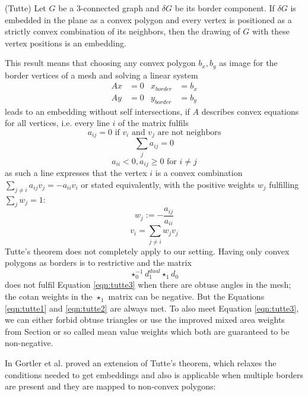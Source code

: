 \begin{thm}(Tutte)\cite{Gortler} Let $G$ be a $3$-connected graph and $\delta G$ be its border component. If $\delta G$ is embedded in the plane as a convex polygon and every vertex is positioned as a strictly convex combination of its neighbors, then the drawing of $G$ with these vertex positions is an embedding. 
\end{thm}

This result means that choosing any convex polygon $b_x, b_y$ as image for the border vertices of a mesh and solving a linear system
\begin{align*}Ax &= 0 & x_{border} &= b_x\\
Ay &= 0 &y_{border} &= b_y\end{align*}
leads to an embedding without self intersections, if $A$ describes convex equations for all vertices, i.e. every line $i$ of the matrix fulfils
\begin{equation}
a_{ij} = 0 \text{ if $v_i$ and $v_j$ are not neighbors} \label{eqn:tutte1}
\end{equation}
\begin{equation}\sum_{j} a_{ij} = 0\label{eqn:tutte2}
\end{equation}
\begin{equation}
a_{ii} <0, a_{ij} \geq 0 \text{ for $i\neq j$}\label{eqn:tutte3}
\end{equation}
as such a line expresses that the vertex $i$ is a convex combination $\sum_{j\neq i} a_{ij} v_j = -a_{ii}v_i$ or stated equivalently, with the positive weights $w_j$ fulfilling $\sum_{j} w_j = 1$:
\[w_j := -\frac{a_{ij}}{a_{ii}}\]
\[v_i = \sum_{j \neq i} w_j v_j\]
Tutte's theorem does not completely apply to our setting. Having only convex polygons as borders is to restrictive and the matrix
\[\star_0^{-1} d_1^{dual} \star_1 d_0\]
does not fulfil Equation \ref{eqn:tutte3} when there are obtuse angles in the mesh; the cotan weights in the $\star_1$ matrix can be negative. But the Equations \ref{eqn:tutte1} and \ref{eqn:tutte2} are always met. 
To also meet Equation \ref{eqn:tutte3}, we can either forbid obtuse triangles or use the improved mixed area weights from Section  or so called mean value weights  which both are guaranteed to be non-negative.

In \cite{Gortler} Gortler et al. proved an extension of Tutte's theorem, which relaxes the conditions needed to get embeddings and also is applicable when multiple borders are present and they are mapped to non-convex polygons:

